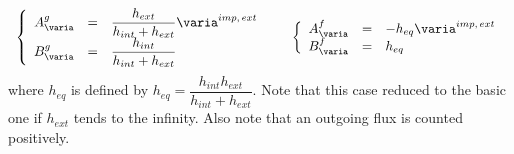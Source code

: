 \begin{equation}
\begin{array}{r c l}
\left\lbrace
\begin{array}{r c l}
A^g_\varia & = &\dfrac{h_{ext}}{h_{int}+h_{ext}} \varia^{imp, \, ext} \\
B^g_\varia & = & \dfrac{h_{int}}{h_{int}+h_{ext}}
\end{array}
\right.
& &
\left\lbrace
\begin{array}{r c l}
A^f_\varia & = & -h_{eq} \varia^{imp, \, ext} \\
B^f_\varia & = & h_{eq}
\end{array}
\right.
\end{array}
\end{equation}
where $h_{eq} $ is defined by $h_{eq}=\dfrac{h_{int} h_{ext}}{ h_{int} + h_{ext}}$.
Note that this case reduced to the basic one if $h_{ext}$ tends to the infinity.
Also note that an outgoing flux is counted positively.



